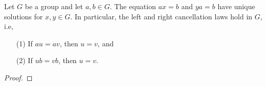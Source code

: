 \begin{prop}
    Let \( G  \) be a group and let \( a,b \in G  \). The equation \( ax = b  \) and \( ya = b  \) have unique solutions for \( x,y \in G  \). In particular, the left and right cancellation laws hold in \( G  \), i.e,
    \begin{enumerate}
        \item[(1)] If \( au = av  \), then \( u = v  \), and
        \item[(2)] If \( ub = vb  \), then \( u = v  \).
    \end{enumerate}
\end{prop}
\begin{proof}

\end{proof}
